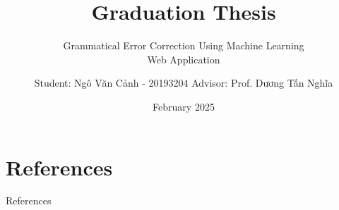 \documentclass[aspectratio=169]{beamer}
\title{Graduation Thesis}
\subtitle{Grammatical Error Correction Using Machine Learning\\Web Application}
\author{Student: Ngô Văn Cảnh - 20193204 \protect\linebreak Advisor: Prof. Dương Tấn Nghĩa}
\date{February 2025}
\begin{document}
\begin{frame}
  \maketitle
\end{frame}






\section{References}
\begin{frame}{References}
  
  
\end{frame}

\begin{frame}{~}
  \begin{center}
    \Large \color{hustred}{Thank you for your attention!}
  \end{center}
\end{frame}
\end{document}
